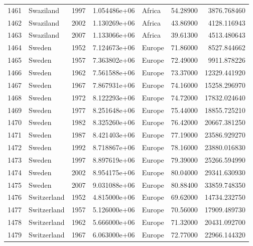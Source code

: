 \documentclass[
  letterpaper,
  DIV=11,
  numbers=noendperiod]{scrreprt}
\begin{document}
\begin{tabular}{llrrlrr}
1461 &                 Swaziland &  1997 &  1.054486e+06 &    Africa &  54.28900 &    3876.768460 \\
1462 &                 Swaziland &  2002 &  1.130269e+06 &    Africa &  43.86900 &    4128.116943 \\
1463 &                 Swaziland &  2007 &  1.133066e+06 &    Africa &  39.61300 &    4513.480643 \\
1464 &                    Sweden &  1952 &  7.124673e+06 &    Europe &  71.86000 &    8527.844662 \\
1465 &                    Sweden &  1957 &  7.363802e+06 &    Europe &  72.49000 &    9911.878226 \\
1466 &                    Sweden &  1962 &  7.561588e+06 &    Europe &  73.37000 &   12329.441920 \\
1467 &                    Sweden &  1967 &  7.867931e+06 &    Europe &  74.16000 &   15258.296970 \\
1468 &                    Sweden &  1972 &  8.122293e+06 &    Europe &  74.72000 &   17832.024640 \\
1469 &                    Sweden &  1977 &  8.251648e+06 &    Europe &  75.44000 &   18855.725210 \\
1470 &                    Sweden &  1982 &  8.325260e+06 &    Europe &  76.42000 &   20667.381250 \\
1471 &                    Sweden &  1987 &  8.421403e+06 &    Europe &  77.19000 &   23586.929270 \\
1472 &                    Sweden &  1992 &  8.718867e+06 &    Europe &  78.16000 &   23880.016830 \\
1473 &                    Sweden &  1997 &  8.897619e+06 &    Europe &  79.39000 &   25266.594990 \\
1474 &                    Sweden &  2002 &  8.954175e+06 &    Europe &  80.04000 &   29341.630930 \\
1475 &                    Sweden &  2007 &  9.031088e+06 &    Europe &  80.88400 &   33859.748350 \\
1476 &               Switzerland &  1952 &  4.815000e+06 &    Europe &  69.62000 &   14734.232750 \\
1477 &               Switzerland &  1957 &  5.126000e+06 &    Europe &  70.56000 &   17909.489730 \\
1478 &               Switzerland &  1962 &  5.666000e+06 &    Europe &  71.32000 &   20431.092700 \\
1479 &               Switzerland &  1967 &  6.063000e+06 &    Europe &  72.77000 &   22966.144320 \\

\end{tabular}
\end{document}
